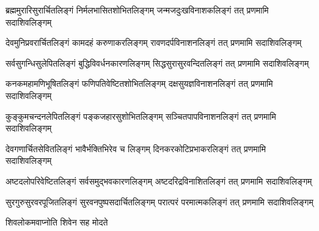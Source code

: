 
\twolineshloka
{ब्रह्ममुरारिसुरार्चितलिङ्गं निर्मलभासितशोभितलिङ्गम्}
{जन्मजदुःखविनाशकलिङ्गं तत् प्रणमामि सदाशिवलिङ्गम्}

\twolineshloka
{देवमुनिप्रवरार्चितलिङ्गं कामदहं करुणाकरलिङ्गम्}
{रावणदर्पविनाशनलिङ्गं तत् प्रणमामि सदाशिवलिङ्गम्}

\twolineshloka
{सर्वसुगन्धिसुलेपितलिङ्गं बुद्धिविवर्धनकारणलिङ्गम्}
{सिद्धसुरासुरवन्दितलिङ्गं तत् प्रणमामि सदाशिवलिङ्गम्}

\twolineshloka
{कनकमहामणिभूषितलिङ्गं फणिपतिवेष्टितशोभितलिङ्गम्}
{दक्षसुयज्ञविनाशनलिङ्गं तत् प्रणमामि सदाशिवलिङ्गम्}

\twolineshloka
{कुङ्कुमचन्दनलेपितलिङ्गं पङ्कजहारसुशोभितलिङ्गम्}
{सञ्चितपापविनाशनलिङ्गं तत् प्रणमामि सदाशिवलिङ्गम्}

\twolineshloka
{देवगणार्चितसेवितलिङ्गं भावैर्भक्तिभिरेव च लिङ्गम्}
{दिनकरकोटिप्रभाकरलिङ्गं तत् प्रणमामि सदाशिवलिङ्गम्}

\twolineshloka
{अष्टदलोपरिवेष्टितलिङ्गं सर्वसमुद्भवकारणलिङ्गम्}
{अष्टदरिद्रविनाशितलिङ्गं तत् प्रणमामि सदाशिवलिङ्गम्}

\twolineshloka
{सुरगुरुसुरवरपूजितलिङ्गं सुरवनपुष्पसदार्चितलिङ्गम्}
{परात्परं परमात्मकलिङ्गं तत् प्रणमामि सदाशिवलिङ्गम्}

{शिवलोकमवाप्नोति शिवेन सह मोदते}